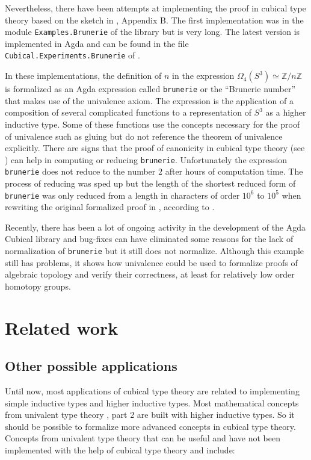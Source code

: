 \documentclass[12pt,a4paper,twoside,xetex]{book} %
\begin{document}
Nevertheless, there have been attempts at implementing the proof in cubical type 
theory based on the sketch in \cite{Brunerie2016}, Appendix B. The first 
implementation was in the module \texttt{Examples.Brunerie} of the library 
\cite{Moertberg2015} but is very long. The latest version is implemented in Agda 
and can be found in the file  \texttt{Cubical.Experiments.Brunerie} of 
\cite{Moertberg2018}. 

In these implementations, the definition of  $n$ in the expression 
$\Omega_4(S^3) \simeq \mathbb{Z}/n\mathbb{Z}$ is formalized as an Agda 
expression called \texttt{brunerie} or the ``Brunerie number'' that makes use 
of the univalence axiom. The expression is the application of a composition of 
several complicated functions to a representation of $S^3$ as a higher 
inductive type. Some of these functions use the concepts necessary for the proof 
of univalence such as gluing but do not reference the theorem of 
univalence explicitly. There are signs that the proof of canonicity in 
cubical type theory (see ) can help in computing 
or reducing \texttt{brunerie}. Unfortunately the expression 
\texttt{brunerie} does not reduce to the number $2$ after hours of 
computation time. The process of reducing was sped up but the length of the
shortest reduced form of  \texttt{brunerie} was  only 
reduced from a length in characters of order $10^6$ to $10^5$ when rewriting 
the original formalized proof \cite{Moertberg2015} in \cite{Moertberg2018},  
according to \cite{Brunerie2018}.

Recently, there has been a lot of ongoing activity in the development of the 
Agda Cubical library and bug-fixes can have eliminated some reasons for the lack 
of normalization of \texttt{brunerie} but it still does not normalize. Although this example still has problems, 
it shows how univalence could be used to formalize proofs of algebraic topology 
and verify their correctness, at least for relatively low order homotopy groups.

\chapter{Related work}

\section{Other possible applications}\label{futapp}

Until now, most applications of cubical type theory are related to implementing 
simple inductive types and higher inductive types. Most mathematical concepts 
from univalent type theory \cite{Voevodsky2013}, part 2 are built with higher 
inductive types. So it should be possible to formalize more advanced concepts in 
cubical type theory. Concepts from univalent type theory that can be useful and 
have not been implemented with the help of cubical type theory and 
\cite{Moertberg2018} include:
\end{document}
